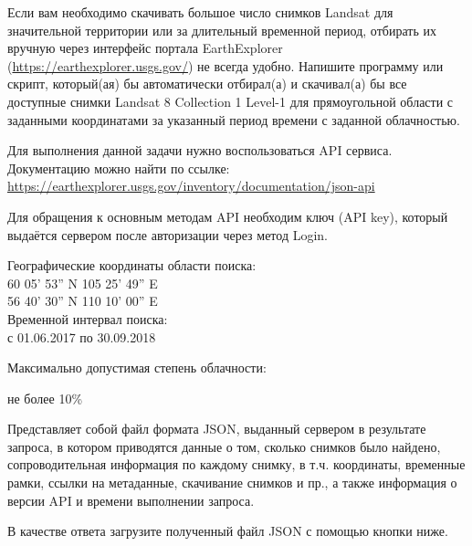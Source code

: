 
Если вам необходимо скачивать большое число снимков Landsat для значительной территории или за 
длительный временной период, отбирать их вручную через интерфейс портала EarthExplorer (\url{https://earthexplorer.usgs.gov/}) не всегда удобно. Напишите программу или скрипт, который(ая) бы автоматически отбирал(а) и скачивал(а) бы все доступные снимки Landsat 8 Collection 1 Level-1 для прямоугольной области с заданными координатами за указанный период времени с заданной облачностью.

Для выполнения данной задачи нужно воспользоваться API сервиса. Документацию можно найти по ссылке:\\
\url{https://earthexplorer.usgs.gov/inventory/documentation/json-api}

Для обращения к основным методам API необходим ключ (API key), который выдаётся сервером после авторизации через метод Login.


Географические координаты области поиска:\\
60 05’ 53” N 105 25’ 49” E\\
56 40’ 30” N 110 10’ 00” E\\

Временной интервал поиска:\\
с 01.06.2017 по 30.09.2018

Максимально допустимая степень облачности:

не более 10\%

\outputfmtSection

Представляет собой файл формата JSON, выданный сервером в результате запроса, в котором приводятся данные о
том, сколько снимков было найдено, сопроводительная информация по каждому
снимку, в т.ч. координаты, временные рамки, ссылки на метаданные, скачивание
снимков и пр., а также информация о версии API и времени выполнении запроса. 

В качестве ответа загрузите полученный файл JSON с помощью кнопки ниже.